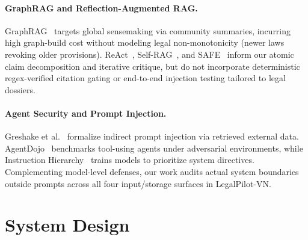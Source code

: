 \documentclass[sigconf,nonacm]{acmart}
\begin{document}
\paragraph{GraphRAG and Reflection-Augmented RAG.}
GraphRAG~\cite{edge2024graphrag} targets global sensemaking via community summaries, incurring high graph-build cost without modeling legal non-monotonicity (newer laws revoking older provisions). ReAct~\cite{yao2023react}, Self-RAG~\cite{asai2024selfrag}, and SAFE~\cite{wei2024safe} inform our atomic claim decomposition and iterative critique, but do not incorporate deterministic regex-verified citation gating or end-to-end injection testing tailored to legal dossiers.

\paragraph{Agent Security and Prompt Injection.}
Greshake et al.~\cite{greshake2023injection} formalize indirect prompt injection via retrieved external data. AgentDojo~\cite{debenedetti2024injection} benchmarks tool-using agents under adversarial environments, while Instruction Hierarchy~\cite{wallace2024instruction} trains models to prioritize system directives. Complementing model-level defenses, our work audits actual system boundaries outside prompts across all four input/storage surfaces in LegalPilot-VN.

\section{System Design}
\label{sec:design}
\end{document}
